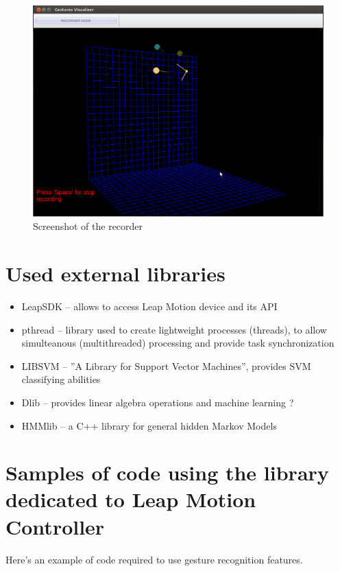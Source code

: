 \begin{figure}[htb]
\centering
 \includegraphics[width=1\columnwidth]{figures/recorder.png}
 \caption{Screenshot of the recorder}
 \label{recorder}
\end{figure}

\section{Used external libraries}

\begin{itemize} 
\item LeapSDK -- allows to access Leap Motion device and its API
\item pthread -- library used to create lightweight processes (threads), to allow simulteanous (multithreaded) processing and provide task synchronization
\item LIBSVM -- ''A Library for Support Vector Machines'', provides SVM classifying abilities
\item Dlib -- provides linear algebra operations and machine learning ?
\item HMMlib -- a C++ library for general hidden Markov Models
\end{itemize}

\section{Samples of code using the library dedicated to Leap Motion Controller}

Here's an example of code required to use gesture recognition features.


